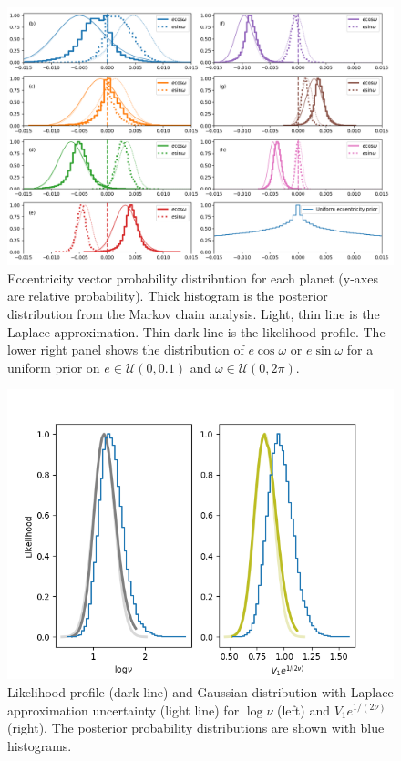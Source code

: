 \documentclass[fleqn,usenatbib]{mnras} %
\begin{document}
\begin{figure}
    \centering
    \includegraphics[width=\hsize]{figures/T1_eccentricity_vectors_likelihood_profile_hmc.png}
    \caption{Eccentricity vector probability distribution for each planet (y-axes are relative probability).  Thick histogram is the posterior distribution from the Markov chain analysis.  Light, thin line is the Laplace approximation.  Thin dark line is the likelihood profile.  The lower right panel shows the distribution of
    $e\cos{\omega}$ or $e\sin{\omega}$ for a uniform prior on
    $e \in \mathcal{U}(0,0.1)$ and $\omega \in \mathcal{U}(0,2\pi)$.}
    \label{fig:ecc_likelihood_profile}
\end{figure}


\begin{figure}
    \centering
    \includegraphics[width=\columnwidth]{figures/T1_students_params_transformed.png}
    \caption{Likelihood profile (dark line) and Gaussian distribution
    with Laplace approximation uncertainty (light line) for $\log{\nu}$ (left) and
    $V_1 e^{1/(2\nu)}$ (right).  The posterior probability distributions are shown with blue histograms.}
    \label{fig:student_param_likelihood_profile}
\end{figure}
\end{document}
